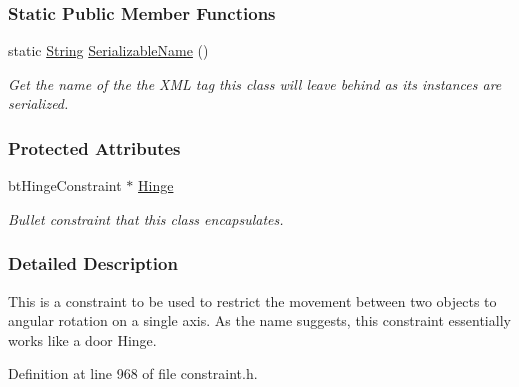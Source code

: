 \subsubsection*{Static Public Member Functions}
\begin{DoxyCompactItemize}
\item 
static \hyperlink{namespaceMezzanine_acf9fcc130e6ebf08e3d8491aebcf1c86}{String} \hyperlink{classMezzanine_1_1HingeConstraint_a0bcb0756ff73f9d772e0c60d188d393a}{SerializableName} ()
\begin{DoxyCompactList}\small\item\em Get the name of the the XML tag this class will leave behind as its instances are serialized. \item\end{DoxyCompactList}\end{DoxyCompactItemize}
\subsubsection*{Protected Attributes}
\begin{DoxyCompactItemize}
\item 
\hypertarget{classMezzanine_1_1HingeConstraint_a5d199b12753d7143ddd521d5f4728b45}{
btHingeConstraint $\ast$ \hyperlink{classMezzanine_1_1HingeConstraint_a5d199b12753d7143ddd521d5f4728b45}{Hinge}}
\label{classMezzanine_1_1HingeConstraint_a5d199b12753d7143ddd521d5f4728b45}

\begin{DoxyCompactList}\small\item\em Bullet constraint that this class encapsulates. \item\end{DoxyCompactList}\end{DoxyCompactItemize}


\subsubsection{Detailed Description}
This is a constraint to be used to restrict the movement between two objects to angular rotation on a single axis. As the name suggests, this constraint essentially works like a door Hinge. 

Definition at line 968 of file constraint.h.



